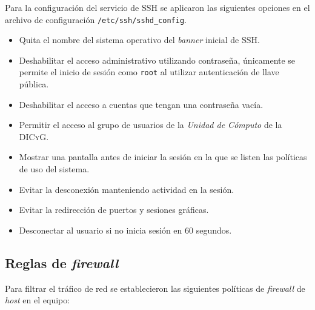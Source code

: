 Para la configuraci\'{o}n del servicio de \textsc{SSH} se aplicaron las siguientes opciones en el archivo de configuraci\'{o}n \texttt{/etc/ssh/sshd\_config}.

\begin{itemize}
  \item Quita el nombre del sistema operativo del \textit{banner} inicial de \textsc{SSH}.
  \item Deshabilitar el acceso administrativo utilizando contrase\~{n}a, \'{u}nicamente se permite el inicio de sesi\'{o}n como \texttt{root} al utilizar autenticaci\'{o}n de llave p\'{u}blica.
  \item Deshabilitar el acceso a cuentas que tengan una contrase\~{n}a vac\'{i}a.
  \item Permitir el acceso al grupo de usuarios de la \emph{Unidad de C\'{o}mputo} de la \textsc{DICyG}.
  \item  Mostrar una pantalla antes de iniciar la sesi\'{o}n en la que se listen las pol\'{i}ticas de uso del sistema.
  \item Evitar la desconexi\'{o}n manteniendo actividad en la sesi\'{o}n.
  \item Evitar la redirecci\'{o}n de puertos y sesiones gr\'{a}ficas.
  \item Desconectar al usuario si no inicia sesi\'{o}n en 60 segundos.
\end{itemize}

      \subsection {Reglas de \textit{firewall}}
      \label{subsec:fw-rules}

Para filtrar el tr\'{a}fico de red se establecieron las siguientes pol\'{i}ticas de \textit{firewall} de \textit{host} en el equipo:

